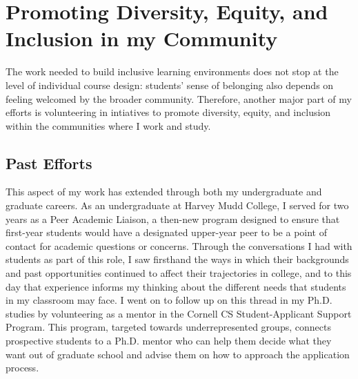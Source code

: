 \documentclass[12pt,letterpaper]{article}
\begin{document}

\section{Promoting Diversity, Equity, and Inclusion in my Community}
The work needed to build inclusive learning environments does not stop at the level of individual course design: students' sense of belonging also depends on feeling welcomed by the broader community.
Therefore, another major part of my efforts is volunteering in intiatives to promote diversity, equity, and inclusion within the communities where I work and study. 

\subsection{Past Efforts}
This aspect of my work has extended through both my undergraduate and graduate careers.
As an undergraduate at Harvey Mudd College, I served for two years as a Peer Academic Liaison, a then-new program designed to ensure that first-year students would have a designated upper-year peer to be a point of contact for academic questions or concerns.
Through the conversations I had with students as part of this role, I saw firsthand the ways in which their backgrounds and past opportunities continued to affect their trajectories in college, and to this day that experience informs my thinking about the different needs that students in my classroom may face.
I went on to follow up on this thread in my Ph.D. studies by volunteering as a mentor in the Cornell CS Student-Applicant Support Program.
This program, targeted towards underrepresented groups, connects prospective students to a Ph.D. mentor who can help them decide what they want out of graduate school and advise them on how to approach the application process.
\end{document}
